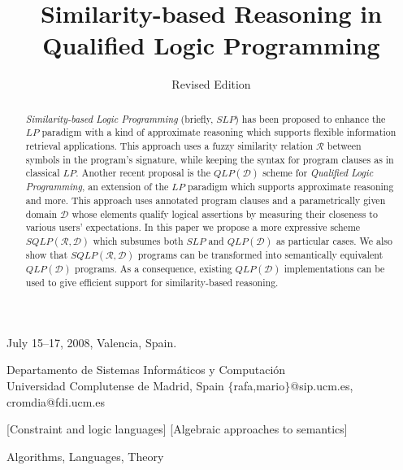 \documentclass{sigplanconf}
\newcommand{\qdom}{\mathcal{D}} \newcommand{\dqdom}{D \setminus \{\bot\}} \newcommand{\bqdom}{(D \setminus \{\bot\}) \uplus \{?\}}
\newcommand{\simrel}{\mathcal{R}}
\newcommand{\qlp}[1]{QLP({#1})} \newcommand{\slp}[2]{SLP({#1,#2})} \newcommand{\sqlp}[2]{SQLP({#1,#2})} \newcommand{\bqlp}[1]{BQLP({#1})} \newcommand{\clp}[1]{CLP({#1})}
\theoremstyle{definition}
\theoremstyle{plain}
\begin{document}
 {July 15--17, 2008, Valencia, Spain.}

           

\title{Similarity-based Reasoning in Qualified Logic Programming}
\subtitle{Revised Edition}

           {Departamento de Sistemas Inform\'aticos y Computaci\'on \\ Universidad Complutense de Madrid, Spain}
           {$\{$rafa,mario$\}$@sip.ucm.es, cromdia@fdi.ucm.es}

\maketitle

\begin{abstract}
{\em Similarity-based Logic Programming} (briefly, $SLP$) has been proposed to enhance the $LP$ paradigm with a kind of approximate reasoning which supports flexible information retrieval applications. This approach uses a fuzzy similarity relation $\simrel$ between symbols in the program's signature,  while keeping the syntax for program  clauses as in classical $LP$. Another recent proposal is the  $\qlp{\qdom}$ scheme for {\em Qualified Logic Programming}, an extension of the $LP$ paradigm which supports approximate reasoning and more. This approach uses annotated program clauses and a parametrically given domain $\qdom$  whose elements  qualify logical assertions by measuring their closeness to various users' expectations. In this paper we propose  a more expressive scheme $\sqlp{\simrel}{\qdom}$ which subsumes both $SLP$ and $\qlp{\qdom}$ as particular cases. We also show that $\sqlp{\simrel}{\qdom}$ programs can be transformed into semantically equivalent $\qlp{\qdom}$ programs.  As a consequence, existing $\qlp{\qdom}$ implementations can be used to give efficient support for similarity-based reasoning.
\end{abstract}

[Constraint and logic languages]
[Algebraic approaches to semantics]

\terms Algorithms, Languages, Theory
\end{document}
